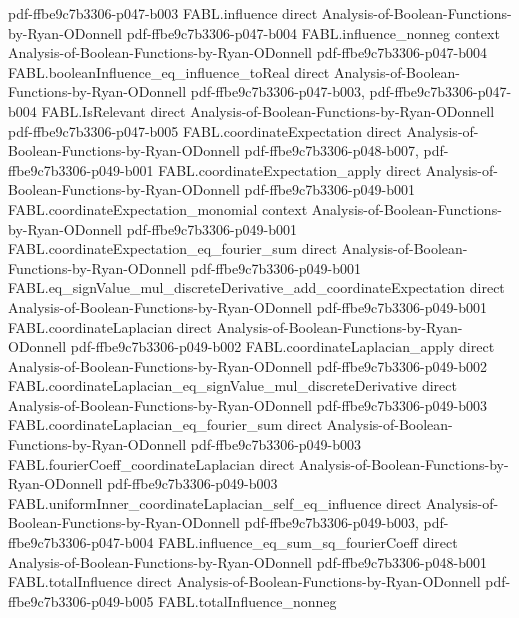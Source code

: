 \begin{theorem}
  {pdf-ffbe9c7b3306-p047-b003}
\proofstep
  {FABL.influence}
  {direct}
  {Analysis-of-Boolean-Functions-by-Ryan-ODonnell}
  {pdf-ffbe9c7b3306-p047-b004}
\proofstep
  {FABL.influence_nonneg}
  {context}
  {Analysis-of-Boolean-Functions-by-Ryan-ODonnell}
  {pdf-ffbe9c7b3306-p047-b004}
\proofstep
  {FABL.booleanInfluence_eq_influence_toReal}
  {direct}
  {Analysis-of-Boolean-Functions-by-Ryan-ODonnell}
  {pdf-ffbe9c7b3306-p047-b003,
    pdf-ffbe9c7b3306-p047-b004}
\proofstep
  {FABL.IsRelevant}
  {direct}
  {Analysis-of-Boolean-Functions-by-Ryan-ODonnell}
  {pdf-ffbe9c7b3306-p047-b005}
\proofstep
  {FABL.coordinateExpectation}
  {direct}
  {Analysis-of-Boolean-Functions-by-Ryan-ODonnell}
  {pdf-ffbe9c7b3306-p048-b007,
    pdf-ffbe9c7b3306-p049-b001}
\proofstep
  {FABL.coordinateExpectation_apply}
  {direct}
  {Analysis-of-Boolean-Functions-by-Ryan-ODonnell}
  {pdf-ffbe9c7b3306-p049-b001}
\proofstep
  {FABL.coordinateExpectation_monomial}
  {context}
  {Analysis-of-Boolean-Functions-by-Ryan-ODonnell}
  {pdf-ffbe9c7b3306-p049-b001}
\proofstep
  {FABL.coordinateExpectation_eq_fourier_sum}
  {direct}
  {Analysis-of-Boolean-Functions-by-Ryan-ODonnell}
  {pdf-ffbe9c7b3306-p049-b001}
\proofstep
  {FABL.eq_signValue_mul_discreteDerivative_add_coordinateExpectation}
  {direct}
  {Analysis-of-Boolean-Functions-by-Ryan-ODonnell}
  {pdf-ffbe9c7b3306-p049-b001}
\proofstep
  {FABL.coordinateLaplacian}
  {direct}
  {Analysis-of-Boolean-Functions-by-Ryan-ODonnell}
  {pdf-ffbe9c7b3306-p049-b002}
\proofstep
  {FABL.coordinateLaplacian_apply}
  {direct}
  {Analysis-of-Boolean-Functions-by-Ryan-ODonnell}
  {pdf-ffbe9c7b3306-p049-b002}
\proofstep
  {FABL.coordinateLaplacian_eq_signValue_mul_discreteDerivative}
  {direct}
  {Analysis-of-Boolean-Functions-by-Ryan-ODonnell}
  {pdf-ffbe9c7b3306-p049-b003}
\proofstep
  {FABL.coordinateLaplacian_eq_fourier_sum}
  {direct}
  {Analysis-of-Boolean-Functions-by-Ryan-ODonnell}
  {pdf-ffbe9c7b3306-p049-b003}
\proofstep
  {FABL.fourierCoeff_coordinateLaplacian}
  {direct}
  {Analysis-of-Boolean-Functions-by-Ryan-ODonnell}
  {pdf-ffbe9c7b3306-p049-b003}
\proofstep
  {FABL.uniformInner_coordinateLaplacian_self_eq_influence}
  {direct}
  {Analysis-of-Boolean-Functions-by-Ryan-ODonnell}
  {pdf-ffbe9c7b3306-p049-b003,
    pdf-ffbe9c7b3306-p047-b004}
\proofstep
  {FABL.influence_eq_sum_sq_fourierCoeff}
  {direct}
  {Analysis-of-Boolean-Functions-by-Ryan-ODonnell}
  {pdf-ffbe9c7b3306-p048-b001}
\proofstep
  {FABL.totalInfluence}
  {direct}
  {Analysis-of-Boolean-Functions-by-Ryan-ODonnell}
  {pdf-ffbe9c7b3306-p049-b005}
\proofstep
  {FABL.totalInfluence_nonneg}

\end{theorem}
